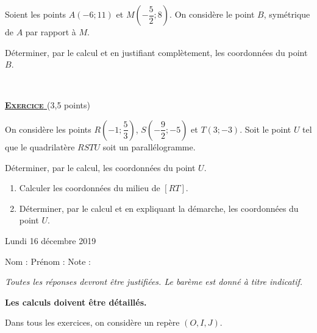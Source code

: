 \documentclass[12pt,a4paper]{article}
\newcounter{nexo}
\newcommand{\exo}{%
\stepcounter{nexo}
{\textbf{\underline{\textsc{Exercice \arabic{nexo}}}}%
\medskip%
}
}
\begin{document}
Soient les points $A(-6;11)$ et $M \left( -\dfrac{5}{2} ; 8 \right) $. On considère le point $B$, symétrique de $A$ par rapport à $M$. \par 
Déterminer, par le calcul et en justifiant complètement, les coordonnées du point $B$.

\bigskip

\newpage

~\vspace{5cm}

\exo \hfill (3,5 points)

On considère les points $R \left( -1 ; \dfrac{5}{3} \right)$, $S\left( -\dfrac{9}{2}  ; -5 \right)$ et $T\left( 3 ; -3 \right)$. Soit le point $U$ tel que le quadrilatère $RSTU$ soit un parallélogramme. \par 
Déterminer, par le calcul, les coordonnées du point $U$.

\begin{enumerate}
\item Calculer les coordonnées du milieu de $[RT]$. 

\vspace{6cm}

\item Déterminer, par le calcul et en expliquant la démarche, les coordonnées du point $U$.
\end{enumerate}

\bigskip


\newpage
\setcounter{nexo}{0}

\begin{center} \huge{} \end{center}

\begin{center} \Large{Lundi 16 décembre 2019} \end{center}

\medskip

Nom : \dotfill Prénom : \dotfill Note : \dotfill

\bigskip

\textit{Toutes les réponses devront être justifiées. Le barème est donné à titre indicatif.} \par 
\textbf{Les calculs doivent être détaillés.} \par

\medskip

Dans tous les exercices, on considère un repère $(O,I,J)$. 
\end{document}
